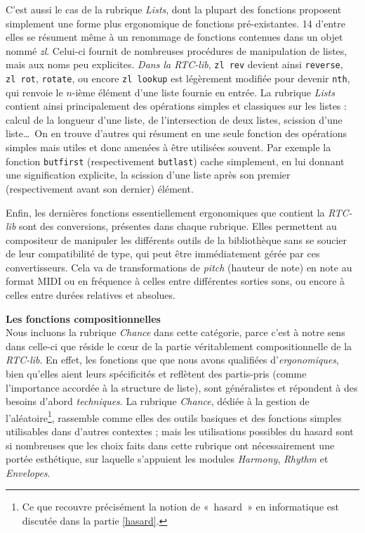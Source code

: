\documentclass[a4paper,12pt]{article}
\newcommand{\guill}[1]{«~#1~»}
\begin{document}
C'est aussi le cas de la rubrique \emph{Lists}, dont la plupart des fonctions proposent simplement une forme plus ergonomique de fonctions pré-existantes. 14 d'entre elles se résument même à un renommage de fonctions contenues dans un objet nommé \emph{zl}. Celui-ci fournit de nombreuses procédures de manipulation de listes, mais aux noms peu explicites. \emph{Dans la RTC-lib}, \texttt{zl~rev} devient ainsi \texttt{reverse}, \texttt{zl~rot}, \texttt{rotate}, ou encore \texttt{zl~lookup} est légèrement modifiée pour devenir \texttt{nth}, qui renvoie le $n$-ième élément d'une liste fournie en entrée. La rubrique \emph{Lists} contient ainsi principalement des opérations simples et classiques sur les listes : calcul de la longueur d'une liste, de l'intersection de deux listes, scission d'une liste\dots~On en trouve d'autres qui résument en une seule fonction des opérations simples mais utiles et donc amenées à être utilisées souvent. Par exemple la fonction \texttt{butfirst} (respectivement \texttt{butlast}) cache simplement, en lui donnant une signification explicite, la scission d'une liste après son premier (respectivement avant son dernier) élément.

Enfin, les dernières fonctions essentiellement ergonomiques que contient la \emph{RTC-lib} sont des conversions, présentes dans chaque rubrique. Elles permettent au compositeur de manipuler les différents outils de la bibliothèque sans se soucier de leur compatibilité de type, qui peut être immédiatement gérée par ces convertisseurs. Cela va de transformations de \emph{pitch} (hauteur de note) en note au format MIDI ou en fréquence à celles entre différentes sorties sons, ou encore à celles entre durées relatives et absolues.

\textbf{Les fonctions compositionnelles} \\
Nous incluons la rubrique \emph{Chance} dans cette catégorie, parce c'est à notre sens dans celle-ci que réside le cœur de la partie véritablement compositionnelle de la \emph{RTC-lib}. En effet, les fonctions que que nous avons qualifiées d'\emph{ergonomiques}, bien qu'elles aient leurs spécificités et reflètent des partis-pris (comme l'importance accordée à la structure de liste), sont généralistes et répondent à des besoins d'abord \emph{techniques}. La rubrique \emph{Chance}, dédiée à la gestion de l'aléatoire\footnote{Ce que recouvre précisément la notion de \guill{hasard} en informatique est discutée dans la partie \ref{hasard}.}, rassemble comme elles des outils basiques et des fonctions simples utilisables dans d'autres contextes ; mais les utilisations possibles du hasard sont si nombreuses que les choix faits dans cette rubrique ont nécessairement une portée esthétique, sur laquelle s'appuient les modules \emph{Harmony}, \emph{Rhythm} et \emph{Envelopes}.
\end{document}
